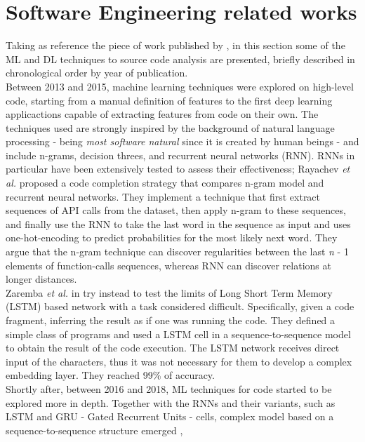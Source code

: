\section{Software Engineering related works}
Taking as reference the piece of work published by \cite{barchi2022deep}, in this section some of the ML and
DL techniques to source code analysis are presented, briefly described in chronological order by 
year of publication.\\ 
Between 2013 and 2015, machine learning techniques were explored on high-level code, starting from a manual 
definition of features to the first deep learning applicactions capable of extracting features from code on their own.
The techniques used are strongly inspired by the background of natural language processing 
- being \textit{most software natural} \cite{hindle2016naturalness} since it is created by human beings - and include n-grams, decision threes, 
and recurrent neural networks (RNN). RNNs in particular have been extensively tested to assess their effectiveness;
Rayachev \textit{et al.} \cite{raychev2014code} proposed a code completion strategy that compares n-gram model and recurrent neural networks. 
They implement a technique that first extract sequences of API calls from the dataset, then apply n-gram to these sequences, and finally use the RNN 
to take the last word in the sequence as input and uses one-hot-encoding to predict probabilities for the most likely next word.
They argue that the n-gram technique can discover regularities between the last \textit{n} - 1 elements of function-calls sequences, whereas RNN can discover
relations at longer distances.\\
Zaremba \textit{et al.} in \cite{zaremba2014learning} try instead to test the limits of Long Short Term Memory (LSTM) based network with a task 
considered difficult. Specifically, given a code fragment, inferring the result as if one was running the code. They 
defined a simple class of programs and used a LSTM cell in a sequence-to-sequence model to obtain the result of the code execution. 
The LSTM network receives direct input of the characters, thus it was not necessary for them to develop a complex 
embedding layer. They reached 99\% of accuracy. \\
\newline
Shortly after, between 2016 and 2018, ML techniques for code started to be explored more in depth. Together with the RNNs and their variants,
such as LSTM and GRU - Gated Recurrent Units - cells, complex model based on a sequence-to-sequence structure emerged \cite{iyer2016summarizing},
